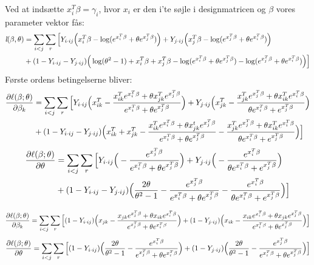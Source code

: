 \documentclass[11pt,a4paper]{article}
\begin{document}
Ved at indsætte $x_i^T\beta=\gamma_i$, hvor $x_i$ er den i'te søjle i designmatricen og $\beta$ vores parameter vektor fås:
\begin{align*}
\textit{l}(\beta,\theta)
&=\sum_{i<j}\sum_r\Big{[}Y_{i\cdot ij}\Big{(}x_i^T\beta-\log(e^{x_i^T\beta}+\theta e^{x_j^T\beta})\Big{)}
+Y_{j\cdot ij}\Big{(}x_j^T\beta-\log(e^{x_j^T\beta}+\theta e^{x_i^T\beta})\Big{)}\\
& +(1-Y_{i\cdot ij}-Y_{j\cdot ij}) \Big{(} \log(\theta^2-1)+x_i^T\beta+x_j^T\beta-\log(e^{x_i^T\beta}+\theta e^{x_j^T\beta})-\log(e^{x_j^T\beta}+\theta e^{x_i^T\beta})\Big{)}\Big{]}
\end{align*}
Første ordens betingelserne bliver:
\textcolor{red}{\begin{align*}
\frac{\partial \ell(\beta;\theta)}{\partial \beta_k}&= 
\sum_{i<j}\sum_r\Big{[}
Y_{i\cdot ij}\Big{(}x_{ik}^T-\frac{x_{ik}^T e^{x_i^T\beta} +\theta x_{jk}^T e^{x_j^T\beta}}{e^{x_i^T\beta}+\theta e^{x_j^T\beta}}\Big{)}
+Y_{j\cdot ij}\Big{(}x_{jk}^T-\frac{x_{jk}^T e^{x_j^T\beta} +\theta x_{ik}^T e^{x_i^T\beta}}{\theta e^{x_i^T\beta} +e^{x_j^T\beta}}\Big{)}\\
&+(1-Y_{i\cdot ij}-Y_{j\cdot ij})\Big{(}x_{ik}^T+x_{jk}^T-\frac{x_{ik}^T e^{x_i^T\beta} +\theta x_{jk}^t e^{x_j^T\beta}}{e^{x_i^T\beta}+\theta e^{x_j^T\beta}}-\frac{x_{jk}^T e^{x_j^T\beta} +\theta x_{ik}^T e^{x_i^T\beta}}{ \theta e^{x_i^T\beta}+e^{x_j^T\beta}}\Big{)}\Big{]}
\end{align*}
}
\begin{align*}
\frac{\partial \ell(\beta;\theta)}{\partial \theta}&=
\sum_{i<j}\sum_r
\Big{[}
 Y_{i\cdot ij}\Big{(}-\frac{e^{x_j^T\beta}}{e^{x_i^T\beta}+\theta e^{x_j^T\beta}}\Big{)}
 +Y_{j\cdot ij}\Big{(}-\frac{e^{x_i^T\beta}}{\theta e^{x_i^T\beta}+ e^{x_j^T\beta}}\Big{)}\\
 &+(1-Y_{i\cdot ij}-Y_{j\cdot ij})\Big{(}\frac{2\theta}{\theta^2-1}-\frac{e^{x_j^T\beta}}{e^{x_i^T\beta}+\theta e^{x_j^T\beta}}-\frac{e^{x_i^T\beta}}{\theta e^{x_i^T\beta}+ e^{x_j^T\beta}}\Big{)}
 \Big{]}
\end{align*}

\begin{equation}
\frac{\partial \ell(\beta;\theta)}{\partial \beta_k}= 
\sum_{i<j}\sum_r\Big{[}
(1-Y_{i\cdot ij})\Big{(}x_{jk}-\frac{x_{jk} e^{x_j^T\beta} +\theta x_{ik} e^{x_i^T\beta}}{e^{x_j^T\beta}+\theta e^{x_i^T\beta}}\Big{)}+(1-Y_{j\cdot ij})\Big{(}x_{ik}-\frac{x_{ik} e^{x_i^T\beta} +\theta x_{jk} e^{x_j^T\beta}}{e^{x_i^T\beta}+\theta e^{x_j^T\beta}}\Big{)}\Big{]}
\end{equation}
\textcolor{red}{
\begin{equation}
\frac{\partial \ell(\beta;\theta)}{\partial \theta}=
\sum_{i<j}\sum_r\Big{[}
 (1-Y_{i\cdot ij})\Big{(}\frac{2\theta}{\theta^2-1}-\frac{e^{x_i^T\beta}}{e^{x_j^T\beta}+\theta e^{x_i^T\beta}}\Big{)}
+(1-Y_{j\cdot ij})\Big{(}\frac{2\theta}{\theta^2-1}-\frac{e^{x_j^T\beta}}{e^{x_i^T\beta}+\theta e^{x_j^T\beta}}\Big{)} \Big{]}
\end{equation}}
\end{document}
